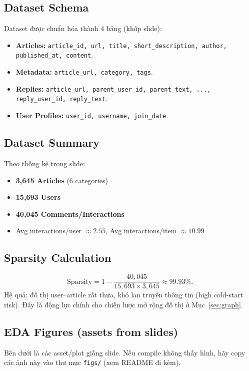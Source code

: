 \documentclass[11pt]{article}
\newcommand{\secref}[1]{Mục~\ref{#1}}
\begin{document}
\subsection{Dataset Schema}
Dataset được chuẩn hóa thành 4 bảng (khớp slide):
\begin{itemize}
  \item \textbf{Articles:} \texttt{article\_id, url, title, short\_description, author, published\_at, content}.
  \item \textbf{Metadata:} \texttt{article\_url, category, tags}.
  \item \textbf{Replies:} \texttt{article\_url, parent\_user\_id, parent\_text, ..., reply\_user\_id, reply\_text}.
  \item \textbf{User Profiles:} \texttt{user\_id, username, join\_date}.
\end{itemize}

\subsection{Dataset Summary}
Theo thống kê trong slide:
\begin{itemize}
  \item \textbf{3,645 Articles} (6 categories)
  \item \textbf{15,693 Users}
  \item \textbf{40,045 Comments/Interactions}
  \item Avg interactions/user $\approx 2.55$, Avg interactions/item $\approx 10.99$
\end{itemize}

\subsection{Sparsity Calculation}
\begin{equation}
\text{Sparsity} = 1 - \frac{40{,}045}{15{,}693 \times 3{,}645} \approx 99.93\%.
\end{equation}
Hệ quả: đồ thị user--article rất thưa, khó lan truyền thông tin (high cold-start risk). Đây là động lực chính cho chiến lược mở rộng đồ thị ở \secref{sec:graph}.

\subsection{EDA Figures (assets from slides)}
Bên dưới là các asset/plot giống slide. Nếu compile không thấy hình, hãy copy các ảnh này vào thư mục \texttt{figs/} (xem README đi kèm).
\end{document}
